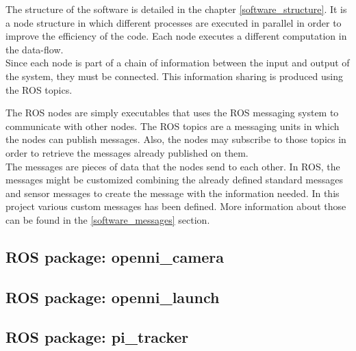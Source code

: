 The structure of the software is detailed in the chapter \ref{software_structure}.  It is a node structure in which different processes are executed in parallel in order to improve the efficiency of the code. Each node executes a different computation in the data-flow. 
\\

Since each node is part of a chain of information between the input and output of the system, they must be connected. This information sharing is produced using the ROS topics. 


The ROS nodes are simply executables that uses the ROS messaging system to communicate with other nodes. The ROS topics are a messaging units in which the nodes can publish messages. Also, the nodes may subscribe to those topics in order to retrieve the messages already published on them. 
\\

The messages are pieces of data that the nodes send to each other. In ROS, the messages might be customized combining the already defined standard messages and sensor messages to create the message with the information needed. In this project various custom messages has been defined. More information about those can be found in the \ref{software_messages} section. 


\subsection{ROS package: openni\_camera}

\subsection{ROS package: openni\_launch}

\subsection{ROS package: pi\_tracker}

